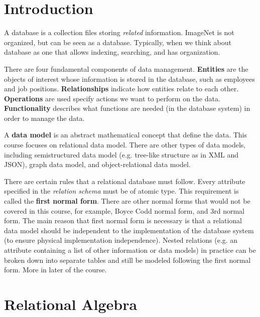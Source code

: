 \documentclass[12pt]{article}
\title{}
\begin{document}
\pagestyle{fancy}
\fancyhf{} %
\cfoot{\thepage}
\renewcommand{\headrulewidth}{1pt}

\section{Introduction}
A database is a collection files storing \emph{related} information. ImageNet is not organized, but can be seen as a database. Typically, when we think about database as one that allows indexing, searching, and has organization.

There are four fundamental components of data management. \textbf{Entities} are the objects of interest whose information is stored in the database, such as employees and job positions. \textbf{Relationships} indicate how entities relate to each other. \textbf{Operations} are used specify actions we want to perform on the data. \textbf{Functionality} describes what functions are needed (in the database system) in order to manage the data.

A \textbf{data model} is an abstract mathematical concept that define the data. This course focuses on relational data model. There are other types of data models, including semistructured data model (e.g. tree-like structure as in XML and JSON), graph data model, and object-relational data model.

There are certain rules that a relational database must follow. Every attribute specified in the \emph{relation schema} must be of atomic type. This requirement is called the \textbf{first normal form}. There are other normal forms that would not be covered in this course, for example, Boyce Codd normal form, and 3rd normal form. The main reason that first normal form is necessary is that a relational data model should be independent to the implementation of the database system (to ensure physical implementation independence). Nested relations (e.g. an attribute containing a list of other information or data models) in practice can be broken down into separate tables and still be modeled following the first normal form. More in later of the course.


\section{Relational Algebra}
\end{document}
